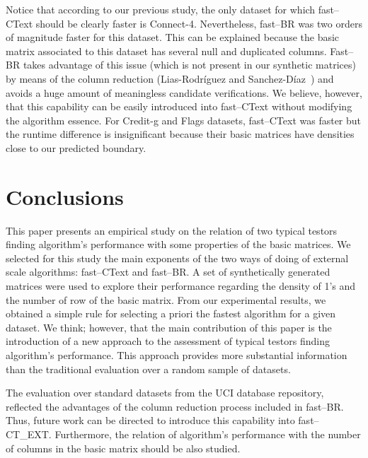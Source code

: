 \documentclass[citeauthoryear]{llncs}
\begin{document}
 Notice that according to our previous study, the only dataset for which fast--CText should be clearly faster is Connect-4. Nevertheless, fast--BR was two orders of magnitude faster for this dataset. This can be explained because the basic matrix associated to this dataset has several null and duplicated columns. Fast--BR takes advantage of this issue (which is not present in our synthetic matrices) by means of the column reduction (Lias-Rodr\'iguez and Sanchez-D\'iaz~\cite{Lias2013}) and avoids a huge amount of meaningless candidate verifications. We believe, however, that this capability can be easily introduced into fast--CText without modifying the algorithm essence. For Credit-g and Flags datasets, fast--CText was faster but the runtime difference is insignificant because their basic matrices have densities close to our predicted boundary.
 
%
\section{Conclusions}
%
 This paper presents an empirical study on the relation of two typical testors finding algorithm's performance with some properties of the basic matrices. We selected for this study the main exponents of the two ways of doing of external scale algorithms: fast--CText and fast--BR. A set of synthetically generated matrices were used to explore their performance regarding the density of 1's and the number of row of the basic matrix. From our experimental results, we obtained a simple rule for selecting a priori the fastest algorithm for a given dataset. We think; however, that the main contribution of this paper is the introduction of a new approach to the assessment of typical testors finding algorithm's performance. This approach provides more substantial information than the traditional evaluation over a random sample of datasets.
 
 The evaluation over standard datasets from the UCI database repository, reflected the advantages of the column reduction process included in fast--BR. Thus, future work can be directed to introduce this capability into fast--CT\_EXT. Furthermore, the relation of algorithm's performance with the number of columns in the basic matrix should be also studied.
\end{document}
